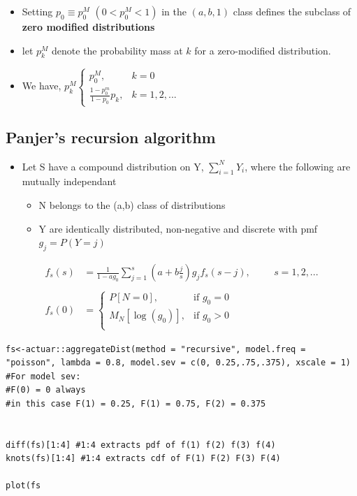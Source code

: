 \documentclass{article}
\begin{document}
\begin{itemize}
    \item Setting $p_0 \equiv p_0^M$ $(0<p_0^M <1)$ in the $(a,b,1)$ class defines the subclass of \textbf{zero modified distributions}
    \item let $p_k^M$ denote the probability mass at $k$ for a zero-modified distribution.
    \item We have,    $p_k^M \begin{cases}
        p_0^M, & k=0 \\
        \frac{1 - p_0^m}{1-p_0} p_k, & k = 1,2,...
    \end{cases}$
\end{itemize}


\subsection{Panjer's recursion algorithm}
\begin{itemize}
    \item Let S have a compound distribution on Y, $\sum_{i=1}^N Y_i$, where the following are mutually independant
    \begin{itemize}
        \item N belongs to the (a,b) class of distributions
        \item Y are identically distributed, non-negative and discrete with pmf $g_j = P(Y=j)$
    \end{itemize}
\end{itemize}
\begin{align*}
    f_s(s) &= \frac{1}{1 - a g_0} \sum_{j=1}^s (a + b \frac{j}{s}) g_j f_s(s-j), \hspace{1cm} s = 1,2,...\\
    \\
    f_s(0) &= \begin{cases}
        P[N=0], & \text{if } g_0 = 0\\
        M_N[\log(g_0)], & \text{if } g_0 > 0\\
    \end{cases}
\end{align*}

\begin{lstlisting}
fs<-actuar::aggregateDist(method = "recursive", model.freq = 
"poisson", lambda = 0.8, model.sev = c(0, 0.25,.75,.375), xscale = 1)
#For model sev:
#F(0) = 0 always
#in this case F(1) = 0.25, F(1) = 0.75, F(2) = 0.375


diff(fs)[1:4] #1:4 extracts pdf of f(1) f(2) f(3) f(4)
knots(fs)[1:4] #1:4 extracts cdf of F(1) F(2) F(3) F(4)

plot(fs
\end{lstlisting}
\end{document}
